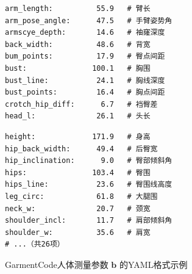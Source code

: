 \begin{figure}[t]
\centering
\begin{minipage}[t]{0.47\linewidth}
\begin{verbatim}
arm_length:          55.9   # 臂长
arm_pose_angle:      47.5   # 手臂姿势角
armscye_depth:       14.6   # 袖窿深度
back_width:          48.6   # 背宽
bum_points:          17.9   # 臀点间距
bust:               100.1   # 胸围
bust_line:           24.1   # 胸线深度
bust_points:         16.4   # 胸点间距
crotch_hip_diff:      6.7   # 裆臀差
head_l:              26.1   # 头长
\end{verbatim}
\end{minipage}
\hfill
\begin{minipage}[t]{0.47\linewidth}
\begin{verbatim}
height:             171.9   # 身高
hip_back_width:      49.4   # 后臀宽
hip_inclination:      9.0   # 臀部倾斜角
hips:               103.4   # 臀围
hips_line:           23.6   # 臀围线高度
leg_circ:            61.8   # 大腿围
neck_w:              20.7   # 颈宽
shoulder_incl:       11.7   # 肩部倾斜角
shoulder_w:          35.6   # 肩宽
# ...（共26项）
\end{verbatim}
\end{minipage}

\caption{GarmentCode人体测量参数 $\mathbf{b}$ 的YAML格式示例}
\label{fig:ch4-body-param}
\end{figure}
